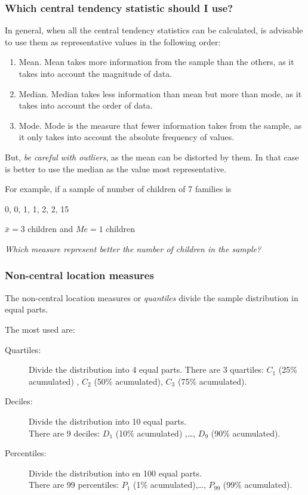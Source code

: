 \begin{frame}
\frametitle{Which central tendency statistic should I use?}
In general, when all the central tendency statistics can be calculated, is advisable to use them as representative
values in the following order:
\begin{enumerate}
\item Mean. Mean takes more information from the sample than the others, as it takes into account the magnitude
of data.
\item Median. Median takes less information than mean but more than mode, as it takes into account the order
of data.
\item Mode. Mode is the measure that fewer information takes from the sample, as it only takes into account the
absolute frequency of values.
\end{enumerate}

But, \emph{be careful with outliers}, as the mean can be distorted by them.
In that case is better to use the median as the value most representative.

For example, if a sample of number of children of 7 families is
\begin{center}
0, 0, 1, 1, 2, 2, 15

$\bar{x}=3$ children \quad and \quad $Me=1$ children

\emph{Which measure represent better the number of children in the sample?}
\end{center}
\end{frame}


\begin{frame}
\frametitle{Non-central location measures}
The non-central location measures or \emph{quantiles} divide the sample distribution in equal parts.

The most used are:
\begin{description}
\item[Quartiles:] Divide the distribution into 4 equal parts. 
There are 3 quartiles: $C_1$ (25\% acumulated) , $C_2$ (50\% acumulated), $C_3$ (75\% acumulated).
\item[Deciles:] Divide the distribution into 10 equal parts.\\
There are 9 deciles: $D_1$ (10\% acumulated) ,\ldots, $D_9$ (90\% acumulated).
\item[Percentiles:] Divide the distribution into en 100 equal parts.\\
There are 99 percentiles: $P_1$ (1\% acumulated),\ldots, $P_{99}$ (99\% acumulated).
\end{description}
\end{frame}


